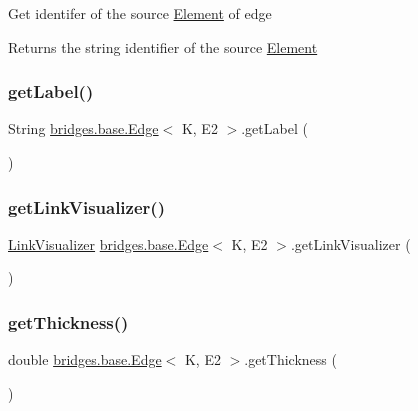 Get identifer of the source \mbox{\hyperlink{classbridges_1_1base_1_1_element}{Element}} of edge

\begin{DoxyReturn}{Returns}
the string identifier of the source \mbox{\hyperlink{classbridges_1_1base_1_1_element}{Element}} 
\end{DoxyReturn}
\mbox{\label{classbridges_1_1base_1_1_edge_a8663708d930e8df460c57d8bdbab44b2}} 
\subsubsection{\texorpdfstring{getLabel()}{getLabel()}}
{\footnotesize\ttfamily String \mbox{\hyperlink{classbridges_1_1base_1_1_edge}{bridges.\+base.\+Edge}}$<$ K, E2 $>$.get\+Label (\begin{DoxyParamCaption}{ }\end{DoxyParamCaption})}

\mbox{\label{classbridges_1_1base_1_1_edge_a11c655622b8a54f2931f59b1d256f84a}} 
\subsubsection{\texorpdfstring{getLinkVisualizer()}{getLinkVisualizer()}}
{\footnotesize\ttfamily \mbox{\hyperlink{classbridges_1_1base_1_1_link_visualizer}{Link\+Visualizer}} \mbox{\hyperlink{classbridges_1_1base_1_1_edge}{bridges.\+base.\+Edge}}$<$ K, E2 $>$.get\+Link\+Visualizer (\begin{DoxyParamCaption}{ }\end{DoxyParamCaption})}

\mbox{\label{classbridges_1_1base_1_1_edge_a3431e83235fc5d5dd5cf747ed4853881}} 
\subsubsection{\texorpdfstring{getThickness()}{getThickness()}}
{\footnotesize\ttfamily double \mbox{\hyperlink{classbridges_1_1base_1_1_edge}{bridges.\+base.\+Edge}}$<$ K, E2 $>$.get\+Thickness (\begin{DoxyParamCaption}{ }\end{DoxyParamCaption})}

